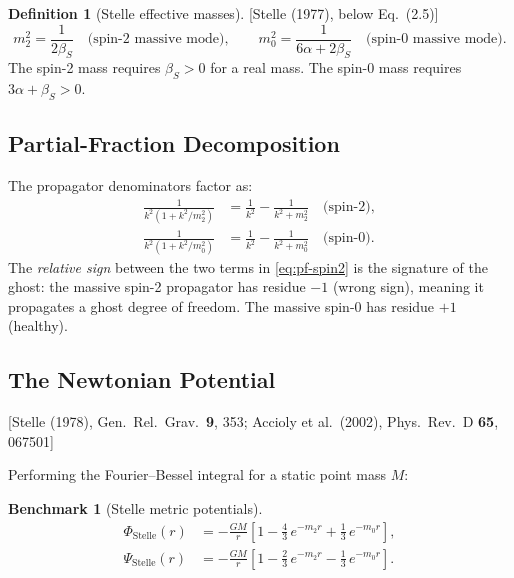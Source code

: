 \documentclass[11pt,a4paper]{article}
\theoremstyle{plain}
\theoremstyle{definition}
\newtheorem{definition}[theorem]{Definition}
\newtheorem{benchmark}[theorem]{Benchmark}
\theoremstyle{remark}
\newcommand{\fromlit}[1]{\textcolor{sctblue}{\textsf{[#1]}}}
\begin{document}
\begin{definition}[Stelle effective masses]\label{def:stelle-masses}
\fromlit{Stelle (1977), below Eq.~(2.5)}
\begin{equation}\label{eq:stelle-masses}
  m_2^2 = \frac{1}{2\beta_S} \quad\text{(spin-2 massive mode)},\qquad
  m_0^2 = \frac{1}{6\alpha + 2\beta_S} \quad\text{(spin-0 massive mode)}.
\end{equation}
The spin-2 mass requires $\beta_S > 0$ for a real mass.
The spin-0 mass requires $3\alpha + \beta_S > 0$.
\end{definition}

\subsection{Partial-Fraction Decomposition}

The propagator denominators factor as:
\begin{align}
  \frac{1}{k^2(1 + k^2/m_2^2)}
  &= \frac{1}{k^2} - \frac{1}{k^2 + m_2^2}
  \quad\text{(spin-2)},
  \label{eq:pf-spin2}\\
  \frac{1}{k^2(1 + k^2/m_0^2)}
  &= \frac{1}{k^2} - \frac{1}{k^2 + m_0^2}
  \quad\text{(spin-0)}.
  \label{eq:pf-spin0}
\end{align}
The \emph{relative sign} between the two terms in \eqref{eq:pf-spin2}
is the signature of the ghost: the massive spin-2 propagator has
residue $-1$ (wrong sign), meaning it propagates a ghost degree of freedom.
The massive spin-0 has residue $+1$ (healthy).

\subsection{The Newtonian Potential}

\fromlit{Stelle (1978), Gen.\ Rel.\ Grav.\ \textbf{9}, 353;
Accioly et al.\ (2002), Phys.\ Rev.\ D \textbf{65}, 067501}

Performing the Fourier--Bessel integral for a static point mass $M$:

\begin{benchmark}[Stelle metric potentials]\label{bench:stelle-pots}
\begin{align}
  \Phi_{\mathrm{Stelle}}(r)
  &= -\frac{GM}{r}\left[
    1 - \frac{4}{3}\,e^{-m_2 r} + \frac{1}{3}\,e^{-m_0 r}
  \right],
  \label{eq:Phi-Stelle}\\
  \Psi_{\mathrm{Stelle}}(r)
  &= -\frac{GM}{r}\left[
    1 - \frac{2}{3}\,e^{-m_2 r} - \frac{1}{3}\,e^{-m_0 r}
  \right].
  \label{eq:Psi-Stelle}
\end{align}
\end{benchmark}
\end{document}
